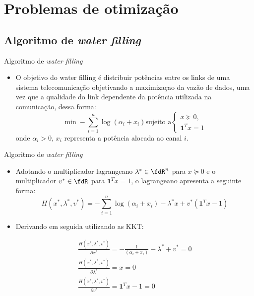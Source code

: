 \section{Problemas de otimização}

\subsection{Algoritmo de {\itshape water filling}}

\begin{frame}{Algoritmo de \textit{water filling}}
  \begin{itemize}
    \item O objetivo do water filling é distribuir potências entre os links de uma sistema telecomunicação objetivando a maximizaçao da vazão de dados, uma vez que a qualidade do link dependente da potência utilizada na comunicação, dessa forma:
    \begin{equation}
    \min - \sum\limits_{i = 1}^n \log(\alpha_{i} + x_{i}) \text{sujeito a}\begin{cases}
    x  \succeq 0, \\
    \textbf{1}^{T}x = 1
    \end{cases}
    \end{equation}
    onde $\alpha_{i} > 0$, $x_{i}$ representa a potência alocada ao canal $i$.
  \end{itemize}
\end{frame}

\begin{frame}{Algoritmo de \textit{water filling}}
  
  \begin{itemize}
    \item Adotando o multiplicador lagrangeano $ \lambda^{*} \in \fdR^n$ para $x \succeq 0$ e o multiplicador $v^{*} \in \fdR$ para $\textbf{1}^{T}x = 1$, o lagrangeano apresenta a seguinte forma:
    \begin{equation}
    H(x^{*},\lambda^{*}, v^{*}) = - \sum\limits_{i = 1}^n \log(\alpha_{i} + x_{i}) - \lambda^{*} x + v^{*}(\textbf{1}^{T}x - 1)
    \end{equation}
    
    \item Derivando em seguida utilizando as KKT: 
    
    \begin{subequations}
      \begin{align}		
      \frac{H(x^{*}, \lambda^{*}, v^{*})}{\partial x^{*}} = - \frac{1}{(\alpha_{i}+x_{i})} - \lambda^{*} + v^{*} = 0\\
      \frac{H(x^{*}, \lambda^{*}, v^{*})}{\partial \lambda^{*}} = x = 0\\
      \frac{H(x^{*}, \lambda^{*}, v^{*})}{\partial v^{*}} = \textbf{1}^{T}x - 1 = 0
      \end{align}
    \end{subequations}
    
    
  \end{itemize}
\end{frame}

